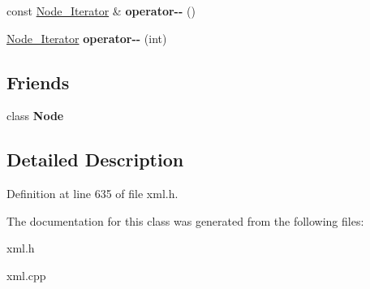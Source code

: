 \begin{DoxyCompactItemize}
\item 
\hypertarget{classphys_1_1xml_1_1Node__Iterator_a230835088dab4916e194e1511b64e2c9}{
const \hyperlink{classphys_1_1xml_1_1Node__Iterator}{Node\_\-Iterator} \& {\bfseries operator-\/-\/} ()}
\label{d5/d93/classphys_1_1xml_1_1Node__Iterator_a230835088dab4916e194e1511b64e2c9}

\item 
\hypertarget{classphys_1_1xml_1_1Node__Iterator_aca6988cc7452c936e72b0ec96da81aed}{
\hyperlink{classphys_1_1xml_1_1Node__Iterator}{Node\_\-Iterator} {\bfseries operator-\/-\/} (int)}
\label{d5/d93/classphys_1_1xml_1_1Node__Iterator_aca6988cc7452c936e72b0ec96da81aed}

\end{DoxyCompactItemize}
\subsection*{Friends}
\begin{DoxyCompactItemize}
\item 
\hypertarget{classphys_1_1xml_1_1Node__Iterator_a6db9d28bd448a131448276ee03de1e6d}{
class {\bfseries Node}}
\label{d5/d93/classphys_1_1xml_1_1Node__Iterator_a6db9d28bd448a131448276ee03de1e6d}

\end{DoxyCompactItemize}


\subsection{Detailed Description}


Definition at line 635 of file xml.h.



The documentation for this class was generated from the following files:\begin{DoxyCompactItemize}
\item 
xml.h\item 
xml.cpp\end{DoxyCompactItemize}
